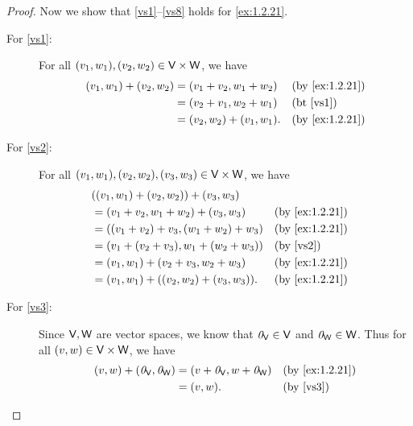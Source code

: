 \begin{proof}
    Now we show that \ref{vs1}--\ref{vs8} holds for \cref{ex:1.2.21}.
    \begin{description}
        \item[For \ref{vs1}:]
            For all \(\p{v_{1}, w_{1}}, \p{v_{2}, w_{2}} \in \V \times \W\), we have
            \begin{align*}
                \p{v_{1}, w_{1}} + \p{v_{2}, w_{2}} & = \p{v_{1} + v_{2}, w_{1} + w_{2}}     &  & \text{(by \cref{ex:1.2.21})} \\
                                                    & = \p{v_{2} + v_{1}, w_{2} + w_{1}}     &  & \text{(bt \ref{vs1})}        \\
                                                    & = \p{v_{2}, w_{2}} + \p{v_{1}, w_{1}}. &  & \text{(by \cref{ex:1.2.21})}
            \end{align*}
        \item[For \ref{vs2}:]
            For all \(\p{v_{1}, w_{1}}, \p{v_{2}, w_{2}}, \p{v_{3}, w_{3}} \in \V \times \W\), we have
            \begin{align*}
                 & \p{\p{v_{1}, w_{1}} + \p{v_{2}, w_{2}}} + \p{v_{3}, w_{3}}                                      \\
                 & = \p{v_{1} + v_{2}, w_{1} + w_{2}} + \p{v_{3}, w_{3}}         &  & \text{(by \cref{ex:1.2.21})} \\
                 & = \p{\p{v_{1} + v_{2}} + v_{3}, \p{w_{1} + w_{2}} + w_{3}}    &  & \text{(by \cref{ex:1.2.21})} \\
                 & = \p{v_{1} + \p{v_{2} + v_{3}}, w_{1} + \p{w_{2} + w_{3}}}    &  & \text{(by \ref{vs2})}        \\
                 & = \p{v_{1}, w_{1}} + \p{v_{2} + v_{3}, w_{2} + w_{3}}         &  & \text{(by \cref{ex:1.2.21})} \\
                 & = \p{v_{1}, w_{1}} + \p{\p{v_{2}, w_{2}} + \p{v_{3}, w_{3}}}. &  & \text{(by \cref{ex:1.2.21})}
            \end{align*}
        \item[For \ref{vs3}:]
            Since \(\mathsf{V}, \mathsf{W}\) are vector spaces, we know that \(\mathit{0}_{\mathsf{V}} \in \mathsf{V}\) and \(\mathit{0}_{\mathsf{W}} \in \mathsf{W}\).
            Thus for all \(\left\lparen v, w\right\rparen \in \mathsf{V} \times \mathsf{W}\), we have
            \begin{align*}
                \p{v, w} + \p{\zv_{\V}, \zv_{\W}} & = \p{v + \zv_{\V}, w + \zv_{\W}} &  & \text{(by \cref{ex:1.2.21})} \\
                                                  & = \p{v, w}.                      &  & \text{(by \ref{vs3})}

\end{align*}
\end{description}
\end{proof}
